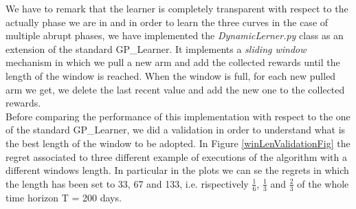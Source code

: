 We have to remark that the learner is completely transparent with respect to the actually phase we are in and in order to learn the three curves in the case of multiple abrupt phases, we have implemented the \textit{DynamicLerner.py} class as an extension of the standard GP\_Learner.
It implements a \textit{sliding window} mechanism in which we pull a new arm and add the collected rewards until the length of the window is reached. When the window is full, for each new pulled arm we get, we delete the last recent value and add the new one to the collected rewards.\\ Before comparing the performance of this implementation with respect to the one of the standard GP\_Learner, we did a validation in order to understand what is the best length of the window to be adopted. In Figure \ref{winLenValidationFig} the regret associated to three different example of executions of the algorithm with a different windows length. In particular in the plots we can se the regrets in which the length has been set to 33, 67 and 133, i.e. rispectively $\frac{1}{6}$, $\frac{1}{3}$ and $\frac{2}{3}$ of the whole time horizon T = 200 days.

